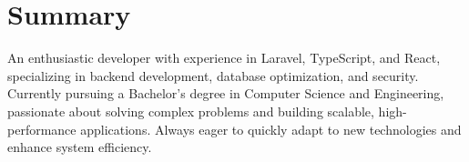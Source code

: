 \section{Summary}

\begin{onecolentry}
    An enthusiastic developer with experience in Laravel, TypeScript, and React, specializing in backend development, database optimization, and security. Currently pursuing a Bachelor’s degree in Computer Science and Engineering, passionate about solving complex problems and building scalable, high-performance applications. Always eager to quickly adapt to new technologies and enhance system efficiency.
\end{onecolentry} 